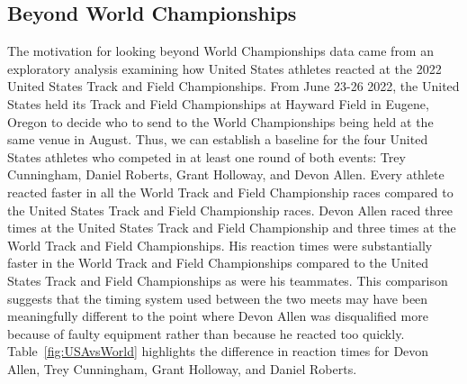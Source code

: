 \documentclass[12pt, letterpaper, titlepage]{article}
\newcommand{\eds}[1]{\textcolor{red}{EDS: (#1)}}
\newcommand{\of}[1]{\textcolor{violet}{OF: #1}}
\begin{document}


\subsection{Beyond World Championships}\label{sec:databeyond}
The motivation for looking beyond World Championships data came from an 
exploratory analysis examining how United States athletes reacted at the 
2022 United States Track and Field Championships.
From June 23-26 2022, the United States held its Track
and Field Championships at Hayward 
Field in Eugene, Oregon to decide who to send to the World Championships 
being held at the same venue in August. %
Thus, we can establish a baseline for the four United States athletes who 
competed in at least one round of both events: Trey Cunningham, Daniel Roberts, 
Grant Holloway, and Devon Allen. Every athlete reacted faster in all the World 
Track and Field Championship races compared to the United States Track and Field 
Championship races. Devon Allen raced three times at the United States Track and
Field Championship and three times at the World Track and Field Championships. 
His reaction times were substantially faster in the World Track and
Field Championships compared to the United States Track and Field Championships 
as were his
teammates. 
This comparison suggests that the timing system used between the two
meets may have been meaningfully different to the point where Devon Allen was
disqualified more because of faulty equipment rather than because he reacted
too quickly.  Table~\ref{fig:USAvsWorld} highlights the difference in reaction 
times for Devon Allen, Trey Cunningham, Grant Holloway, and Daniel Roberts. 
\end{document}
